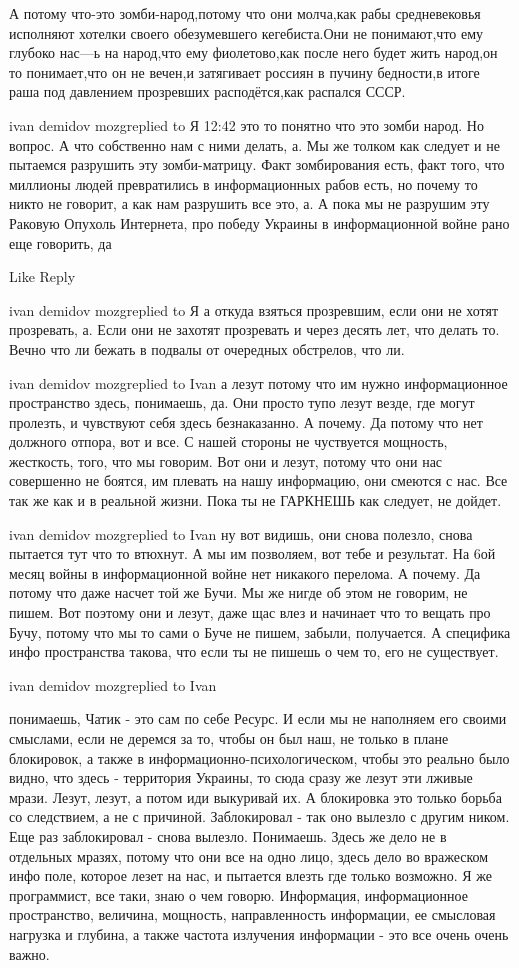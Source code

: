 А потому что-это зомби-народ,потому что они молча,как рабы средневековья
исполняют хотелки своего обезумевшего кегебиста.Они не понимают,что ему глубоко
нас---ь на народ,что ему фиолетово,как после него будет жить народ,он то
понимает,что он не вечен,и затягивает россиян в пучину бедности,в итоге раша
под давлением прозревших расподётся,как распался СССР.


ivan demidov mozgreplied to Я
12:42
это то понятно что это зомби народ. Но вопрос. А что собственно нам с ними делать, а. Мы же толком как следует и не пытаемся разрушить эту зомби-матрицу. Факт зомбирования есть, факт того, что миллионы людей превратились в информационных рабов есть, но почему то никто не говорит, а как нам разрушить все это, а. А пока мы не разрушим эту Раковую Опухоль Интернета, про победу Украины в информационной войне рано еще говорить, да

    Like
    Reply

ivan demidov mozgreplied to Я
а откуда взяться прозревшим, если они не хотят прозревать, а. Если они не захотят прозревать и через десять лет, что делать то. Вечно что ли бежать в подвалы от очередных обстрелов, что ли.

ivan demidov mozgreplied to Ivan
а лезут потому что им нужно информационное пространство здесь, понимаешь, да. Они просто тупо лезут везде, где могут пролезть, и чувствуют себя здесь безнаказанно. А почему. Да потому что нет должного отпора, вот и все. С нашей стороны не чуствуется мощность, жесткость, того, что мы говорим. Вот они и лезут, потому что они нас совершенно не боятся, им плевать на нашу информацию, они смеются с нас. Все так же как и в реальной жизни. Пока ты не ГАРКНЕШЬ как следует, не дойдет.

ivan demidov mozgreplied to Ivan
ну вот видишь, они снова полезло, снова пытается тут что то втюхнут. А мы им позволяем, вот тебе и результат. На 6ой месяц войны в информационной войне нет никакого перелома. А почему. Да потому что даже насчет той же Бучи. Мы же нигде об этом не говорим, не пишем. Вот поэтому они и лезут, даже щас влез и начинает что то вещать про Бучу, потому что мы то сами о Буче не пишем, забыли, получается. А специфика инфо пространства такова, что если ты не пишешь о чем то, его не существует.

ivan demidov mozgreplied to Ivan

понимаешь, Чатик - это сам по себе Ресурс. И если мы не наполняем его своими
смыслами, если не деремся за то, чтобы он был наш, не только в плане
блокировок, а также в информационно-психологическом, чтобы это реально было
видно, что здесь - территория Украины, то сюда сразу же лезут эти лживые мрази.
Лезут, лезут, а потом иди выкуривай их. А блокировка это только борьба со
следствием, а не с причиной. Заблокировал - так оно вылезло с другим ником. Еще
раз заблокировал - снова вылезло. Понимаешь. Здесь же дело не в отдельных
мразях, потому что они все на одно лицо, здесь дело во вражеском инфо поле,
которое лезет на нас, и пытается влезть где только возможно. Я же программист,
все таки, знаю о чем говорю. Информация, информационное пространство, величина,
мощность, направленность информации, ее смысловая нагрузка и глубина, а также
частота излучения информации - это все очень очень важно.


